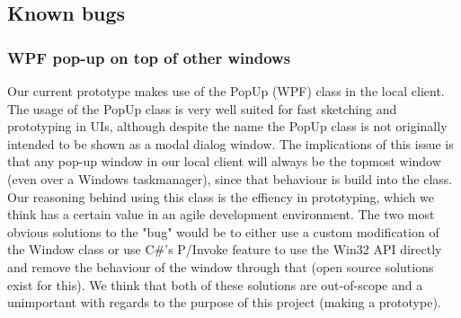 \subsection{Known bugs}
\label{sec:bugs}

\subsubsection{WPF pop-up on top of other windows}
Our current prototype makes use of the PopUp (WPF) class in the local client. The usage of the PopUp class is very well suited for fast sketching and prototyping in UIs, although despite the name the PopUp class is not originally intended to be shown as a modal dialog window. The implications of this issue is that any pop-up window in our local client will always be the topmost window (even over a Windows taskmanager), since that behaviour is build into the class. Our reasoning behind using this class is the effiency in prototyping, which we think has a certain value in an agile development environment. The two most obvious solutions to the "bug" would be to either use a custom modification of the Window class or use C\#'s P/Invoke feature to use the Win32 API directly and remove the behaviour of the window through that (open source solutions exist for this). We think that both of these solutions are out-of-scope and a unimportant with regards to the purpose of this project (making a prototype).